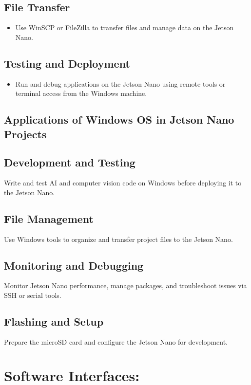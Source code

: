 \subsection*{File Transfer}
\begin{itemize}
	\item Use WinSCP or FileZilla to transfer files and manage data on the Jetson Nano.
\end{itemize}

\subsection*{Testing and Deployment}
\begin{itemize}
	\item Run and debug applications on the Jetson Nano using remote tools or terminal access from the Windows machine.
\end{itemize}

\subsection{Applications of Windows OS in Jetson Nano Projects}
\subsection*{Development and Testing}
Write and test AI and computer vision code on Windows before deploying it to the Jetson Nano.

\subsection*{File Management}
Use Windows tools to organize and transfer project files to the Jetson Nano.

\subsection*{Monitoring and Debugging}
Monitor Jetson Nano performance, manage packages, and troubleshoot issues via SSH or serial tools.

\subsection*{Flashing and Setup}
Prepare the microSD card and configure the Jetson Nano for development. \cite{NVS:2025}


\section{Software Interfaces:}
